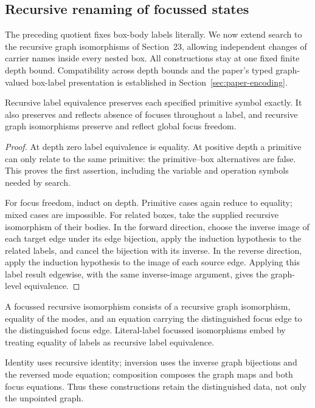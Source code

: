 \subsection{Recursive renaming of focussed states}
\label{sec:recursive-state-search}
The preceding quotient fixes box-body labels literally. We now extend search
to the recursive graph isomorphisms of Section~23, allowing independent changes
of carrier names inside every nested box. All constructions stay at one fixed
finite depth bound. Compatibility across depth bounds and the paper's typed graph-valued box-label
presentation is established in Section~\ref{sec:paper-encoding}.

\begin{lemma}
Recursive label equivalence preserves each specified primitive symbol exactly.
It also preserves and reflects absence of focuses throughout a label, and
recursive graph isomorphisms preserve and reflect global focus freedom.
\end{lemma}
\begin{proof}
At depth zero label equivalence is equality. At positive depth a primitive can
only relate to the same primitive: the primitive--box alternatives are false.
This proves the first assertion, including the variable and operation symbols
needed by search.

For focus freedom, induct on depth. Primitive cases again reduce to equality;
mixed cases are impossible. For related boxes, take the supplied recursive
isomorphism of their bodies. In the forward direction, choose the inverse
image of each target edge under its edge bijection, apply the induction
hypothesis to the related labels, and cancel the bijection with its inverse.
In the reverse direction, apply the induction hypothesis to the image of each
source edge. Applying this label result edgewise, with the same inverse-image
argument, gives the graph-level equivalence.
\end{proof}

\begin{definition}
A focussed recursive isomorphism consists of a recursive graph isomorphism,
equality of the modes, and an equation carrying the distinguished focus edge
to the distinguished focus edge. Literal-label focussed isomorphisms embed
by treating equality of labels as recursive label equivalence.
\end{definition}
Identity uses recursive identity; inversion uses the inverse graph bijections
and the reversed mode equation; composition composes the graph maps and both
focus equations. Thus these constructions retain the distinguished data,
not only the unpointed graph.

